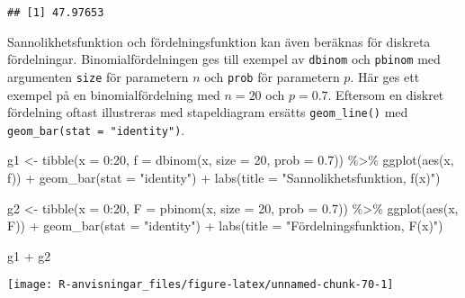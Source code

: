 \documentclass[
]{book}
\newenvironment{Shaded}{\begin{snugshade}}{\end{snugshade}}
\newcommand{\AttributeTok}[1]{\textcolor[rgb]{0.77,0.63,0.00}{#1}}
\newcommand{\DecValTok}[1]{\textcolor[rgb]{0.00,0.00,0.81}{#1}}
\newcommand{\FloatTok}[1]{\textcolor[rgb]{0.00,0.00,0.81}{#1}}
\newcommand{\FunctionTok}[1]{\textcolor[rgb]{0.00,0.00,0.00}{#1}}
\newcommand{\NormalTok}[1]{#1}
\newcommand{\OtherTok}[1]{\textcolor[rgb]{0.56,0.35,0.01}{#1}}
\newcommand{\SpecialCharTok}[1]{\textcolor[rgb]{0.00,0.00,0.00}{#1}}
\newcommand{\StringTok}[1]{\textcolor[rgb]{0.31,0.60,0.02}{#1}}
\theoremstyle{definition}
\theoremstyle{definition}
\theoremstyle{definition}
\theoremstyle{definition}
\theoremstyle{remark}
\begin{document}
\begin{verbatim}
## [1] 47.97653
\end{verbatim}

Sannolikhetsfunktion och fördelningsfunktion kan även beräknas för diskreta fördelningar. Binomialfördelningen ges till exempel av \texttt{dbinom} och \texttt{pbinom} med argumenten \texttt{size} för parametern \(n\) och \texttt{prob} för parametern \(p\). Här ges ett exempel på en binomialfördelning med \(n = 20\) och \(p = 0.7\). Eftersom en diskret fördelning oftast illustreras med stapeldiagram ersätts \texttt{geom\_line()} med \texttt{geom\_bar(stat\ =\ "identity")}.

\begin{Shaded}
\begin{Highlighting}[]
\NormalTok{g1 }\OtherTok{\textless{}{-}} \FunctionTok{tibble}\NormalTok{(}\AttributeTok{x =} \DecValTok{0}\SpecialCharTok{:}\DecValTok{20}\NormalTok{,}
             \AttributeTok{f =} \FunctionTok{dbinom}\NormalTok{(x, }\AttributeTok{size =} \DecValTok{20}\NormalTok{, }\AttributeTok{prob =} \FloatTok{0.7}\NormalTok{)) }\SpecialCharTok{\%\textgreater{}\%} 
  \FunctionTok{ggplot}\NormalTok{(}\FunctionTok{aes}\NormalTok{(x, f)) }\SpecialCharTok{+} 
  \FunctionTok{geom\_bar}\NormalTok{(}\AttributeTok{stat =} \StringTok{"identity"}\NormalTok{) }\SpecialCharTok{+}
  \FunctionTok{labs}\NormalTok{(}\AttributeTok{title =} \StringTok{"Sannolikhetsfunktion, f(x)"}\NormalTok{)}

\NormalTok{g2 }\OtherTok{\textless{}{-}} \FunctionTok{tibble}\NormalTok{(}\AttributeTok{x =} \DecValTok{0}\SpecialCharTok{:}\DecValTok{20}\NormalTok{,}
             \AttributeTok{F =} \FunctionTok{pbinom}\NormalTok{(x, }\AttributeTok{size =} \DecValTok{20}\NormalTok{, }\AttributeTok{prob =} \FloatTok{0.7}\NormalTok{)) }\SpecialCharTok{\%\textgreater{}\%} 
  \FunctionTok{ggplot}\NormalTok{(}\FunctionTok{aes}\NormalTok{(x, F)) }\SpecialCharTok{+} 
  \FunctionTok{geom\_bar}\NormalTok{(}\AttributeTok{stat =} \StringTok{"identity"}\NormalTok{) }\SpecialCharTok{+}
  \FunctionTok{labs}\NormalTok{(}\AttributeTok{title =} \StringTok{"Fördelningsfunktion, F(x)"}\NormalTok{)}

\NormalTok{g1 }\SpecialCharTok{+}\NormalTok{ g2}
\end{Highlighting}
\end{Shaded}

\begin{center}\texttt{[image: R-anvisningar\_files/figure-latex/unnamed-chunk-70-1]} \end{center}
\end{document}
